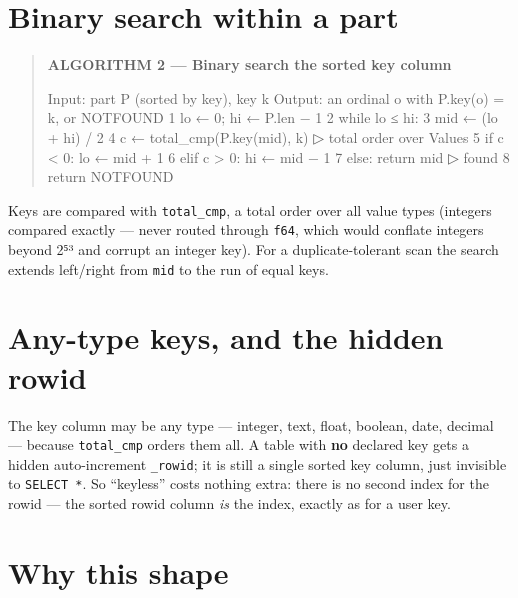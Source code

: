 \documentclass[
  11pt,
  openany]{book}
\newenvironment{Shaded}{}{}
\newcommand{\NormalTok}[1]{#1}
\begin{document}
\section{Binary search within a part}\label{binary-search-within-a-part}

\begin{quote}
\textbf{ALGORITHM 2 --- Binary search the sorted key column}

\begin{Shaded}
\begin{Highlighting}[]
\NormalTok{Input:  part P (sorted by key), key k}
\NormalTok{Output: an ordinal o with P.key(o) = k, or NOTFOUND}
\NormalTok{1  lo ← 0;  hi ← P.len − 1}
\NormalTok{2  while lo ≤ hi:}
\NormalTok{3      mid ← (lo + hi) / 2}
\NormalTok{4      c ← total\_cmp(P.key(mid), k)                    ▷ total order over Values}
\NormalTok{5      if c \textless{} 0: lo ← mid + 1}
\NormalTok{6      elif c \textgreater{} 0: hi ← mid − 1}
\NormalTok{7      else: return mid                                ▷ found}
\NormalTok{8  return NOTFOUND}
\end{Highlighting}
\end{Shaded}
\end{quote}

Keys are compared with \texttt{total\_cmp}, a total order over all value
types (integers compared exactly --- never routed through \texttt{f64},
which would conflate integers beyond 2⁵³ and corrupt an integer key).
For a duplicate-tolerant scan the search extends left/right from
\texttt{mid} to the run of equal keys.

\section{Any-type keys, and the hidden
rowid}\label{any-type-keys-and-the-hidden-rowid}

The key column may be any type --- integer, text, float, boolean, date,
decimal --- because \texttt{total\_cmp} orders them all. A table with
\textbf{no} declared key gets a hidden auto-increment \texttt{\_rowid};
it is still a single sorted key column, just invisible to
\texttt{SELECT\ *}. So ``keyless'' costs nothing extra: there is no
second index for the rowid --- the sorted rowid column \emph{is} the
index, exactly as for a user key.

\section{Why this shape}\label{why-this-shape}
\end{document}
